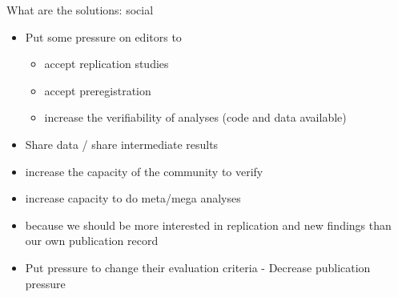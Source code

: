 \begin{frame}{What are the solutions: social}

\begin{itemize}
\itemsep1pt\parskip0pt
\item
  Put some pressure on editors to

  \begin{itemize}
  \itemsep1pt\parskip0pt
  \item
    accept replication studies
  \item
    accept preregistration
  \item
    increase the verifiability of analyses (code and data available)
  \end{itemize}
\item
  Share data / share intermediate results
\item
  increase the capacity of the community to verify
\item
  increase capacity to do meta/mega analyses
\item
  because we should be more interested in replication and new findings
  than our own publication record
\item
  Put pressure to change their evaluation criteria - Decrease
  publication pressure
\end{itemize}

\end{frame}
